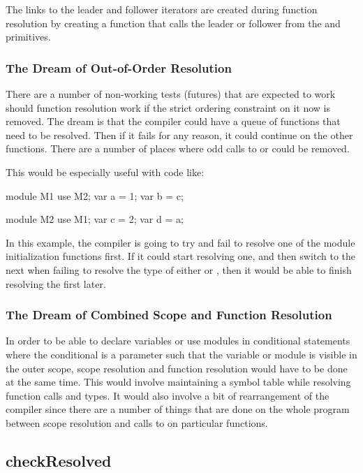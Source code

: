 \documentclass[10pt]{article}
\begin{document}
The links to the leader and follower iterators are created during
function resolution by creating a function that calls the leader or
follower from the  and  primitives.

\subsubsection{The Dream of Out-of-Order Resolution}

There are a number of non-working tests (futures) that are expected to
work should function resolution work if the strict ordering constraint
on it now is removed.  The dream is that the compiler could have a
queue of functions that need to be resolved.  Then if it fails for any
reason, it could continue on the other functions.  There are a number
of places where odd calls to  or  could
be removed.

This would be especially useful with code like:
\begin{chapel}
module M1 {
  use M2;
  var a = 1;
  var b = c;
}

module M2 {
  use M1;
  var c = 2;
  var d = a;
}
\end{chapel}
In this example, the compiler is going to try and fail to resolve one
of the module initialization functions first.  If it could start
resolving one, and then switch to the next when failing to resolve the
type of either  or , then it would be able to finish
resolving the first later.

\subsubsection{The Dream of Combined Scope and Function Resolution}

In order to be able to declare variables or use modules in conditional
statements where the conditional is a parameter such that the variable
or module is visible in the outer scope, scope resolution and function
resolution would have to be done at the same time.  This would involve
maintaining a symbol table while resolving function calls and types.
It would also involve a bit of rearrangement of the compiler since
there are a number of things that are done on the whole program
between scope resolution and calls to  on particular
functions.

\subsection{checkResolved}
\end{document}
